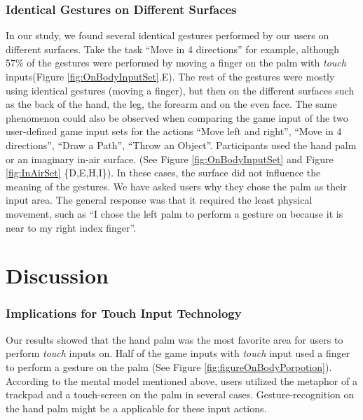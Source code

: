 \documentclass{sigchi}
\begin{document}
\subsubsection{Identical Gestures on Different Surfaces}
 In our study, we found several identical gestures performed by our users on different surfaces. Take the task ``Move in 4 directions'' for example, although 57\% of the gestures were performed by moving a finger on the palm with \emph{touch} inputs(Figure \ref{fig:OnBodyInputSet}.E). The rest of the gestures were mostly using identical gestures (moving a finger), but then on the different surfaces such as the back of the hand, the leg, the forearm and on the even face. The same phenomenon could also be observed when comparing the game input of the two user-defined game input sets for the actions ``Move left and right'', ``Move in 4 directions'', ``Draw a Path'', ``Throw an Object''. Participants used the hand palm or an imaginary in-air surface. 
 (See Figure \ref{fig:OnBodyInputSet} and Figure \ref{fig:InAirSet} \{D,E,H,I\}). In these cases, the surface did not influence the meaning of the gestures. We have asked users why they chose the palm as their input area. The general response was that it required the least physical movement, such as ``I chose the left palm to perform a gesture on because it is near to my right index finger''. 

  \section{Discussion}

    \subsubsection{Implications for Touch Input Technology}
    Our results showed that the hand palm was the most favorite area for users to perform \emph{touch} inputs on. Half of the game inputs with \emph{touch} input used a finger to perform a gesture on the palm (See Figure \ref{fig:figureOnBodyPorpotion}). According to the mental model mentioned above, users utilized the metaphor of a trackpad and a touch-screen on the palm in several cases. Gesture-recognition on the hand palm might be a applicable for these input actions.

\end{document}
